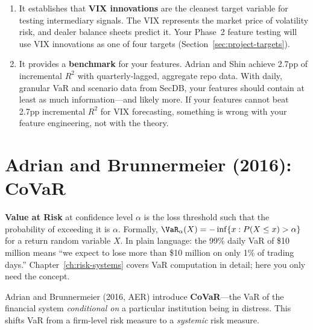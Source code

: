 \begin{enumerate}[nosep]
  \item It establishes that \textbf{VIX innovations} are the cleanest target variable for testing intermediary signals. The VIX represents the market price of volatility risk, and dealer balance sheets predict it. Your Phase~2 feature testing will use VIX innovations as one of four targets (Section~\ref{sec:project-targets}).
  \item It provides a \textbf{benchmark} for your features. Adrian and Shin achieve 2.7pp of incremental $R^2$ with quarterly-lagged, aggregate repo data. With daily, granular VaR and scenario data from SecDB, your features should contain at least as much information---and likely more. If your features cannot beat 2.7pp incremental $R^2$ for VIX forecasting, something is wrong with your feature engineering, not with the theory.
\end{enumerate}

\section{Adrian and Brunnermeier (2016): CoVaR}
\label{sec:covar}

\begin{prereq}
\textbf{Value at Risk} at confidence level $\alpha$ is the loss threshold such that the probability of exceeding it is $\alpha$. Formally, $\VaR_\alpha(X) = -\inf\{x : P(X \leq x) > \alpha\}$ for a return random variable $X$. In plain language: the 99\% daily VaR of \$10 million means ``we expect to lose more than \$10 million on only 1\% of trading days.'' Chapter~\ref{ch:risk-systems} covers VaR computation in detail; here you only need the concept.
\end{prereq}

Adrian and Brunnermeier (2016, AER) introduce \textbf{CoVaR}---the VaR of the financial system \emph{conditional on} a particular institution being in distress. This shifts VaR from a firm-level risk measure to a \emph{systemic} risk measure.

